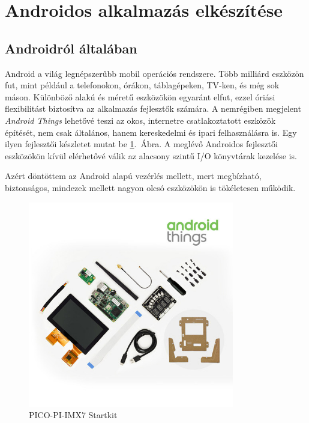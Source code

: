 \documentclass[../main.tex]{subfiles}
\begin{document}
\section{Androidos alkalmazás elkészítése}
    \subsection{Androidról általában}
        Android a világ legnépszerűbb mobil operációs rendszere. Több milliárd eszközön fut, mint például a telefonokon, órákon, táblagépeken, TV-ken, és még sok máson. 
        Különböző alakú és méretű eszközökön egyaránt elfut, ezzel óriási flexibilitást biztosítva az alkalmazás fejlesztők számára. 
        A nemrégiben megjelent \textit{Android Things} lehetővé teszi az okos, internetre csatlakoztatott eszközök építését, nem csak általános, hanem kereskedelmi és ipari felhasználásra is. Egy ilyen fejlesztői készletet mutat be  \ref{fig:android_things}.~Ábra. A meglévő Androidos fejlesztői eszközökön kívül elérhetővé válik az alacsony szintű I/O könyvtárak kezelése is. 
        
        Azért döntöttem az Android alapú vezérlés mellett, mert megbízható, biztonságos, mindezek mellett nagyon olcsó eszközökön is tökéletesen működik. 
        
        \begin{figure}[h!] %
            \centering
            \includegraphics[height=9cm]{android_res/pico-pi-imx7-startkit.jpg}
            \caption{PICO-PI-IMX7 Startkit}
            \label{fig:android_things}
        \end{figure}
        
\end{document}
